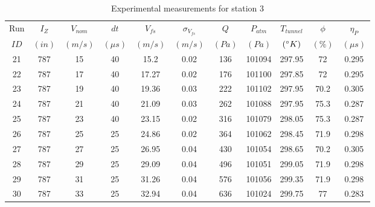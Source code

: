 \begin{table}[H]
\begin{center}
\begin{tabular}{|ccccccccccc|}
	\hline
	Run & $I_Z$ & $V_{nom}$ & $dt$ & $V_{fs}$ & $\sigma_{V_{fs}}$ & $Q$ & $P_{atm}$ & $T_{tunnel}$ & $\phi$ & $\eta_P$\\
	$ID$ & $(in)$ & $(m/s)$ & $(\mu s)$ & $(m/s)$ & $(m/s)$ & $(Pa)$ & $(Pa)$ & $(\degree K)$ & $(\%)$ & $(\mu s)$\\
	\hline
	21 & 787 & 15 & 40 & 15.2 & 0.02 & 136 & 101094 & 297.95 & 72 & 0.295\\
	22 & 787 & 17 & 40 & 17.27 & 0.02 & 176 & 101100 & 297.85 & 72 & 0.295\\
	23 & 787 & 19 & 40 & 19.36 & 0.03 & 222 & 101102 & 297.95 & 70.2 & 0.305\\
	24 & 787 & 21 & 40 & 21.09 & 0.03 & 262 & 101088 & 297.95 & 75.3 & 0.287\\
	25 & 787 & 23 & 40 & 23.15 & 0.02 & 316 & 101079 & 298.05 & 75.3 & 0.287\\
	26 & 787 & 25 & 25 & 24.86 & 0.02 & 364 & 101062 & 298.45 & 71.9 & 0.298\\
	27 & 787 & 27 & 25 & 26.95 & 0.04 & 430 & 101054 & 298.65 & 70.2 & 0.305\\
	28 & 787 & 29 & 25 & 29.09 & 0.04 & 496 & 101051 & 299.05 & 71.9 & 0.298\\
	29 & 787 & 31 & 25 & 31.26 & 0.04 & 576 & 101056 & 299.35 & 71.9 & 0.298\\
	30 & 787 & 33 & 25 & 32.94 & 0.04 & 636 & 101024 & 299.75 & 77 & 0.283\\
	\hline
\end{tabular}
\caption{Experimental measurements for station 3}
\label{table:station_3_measurements}
\end{center}
\end{table}
